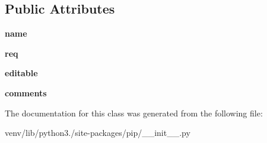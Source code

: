 \subsection*{Public Attributes}
\begin{DoxyCompactItemize}
\item 
\mbox{\label{classpip_1_1_frozen_requirement_a99dff1843f71d295ff1d7410cb85c6b8}} 
{\bfseries name}
\item 
\mbox{\label{classpip_1_1_frozen_requirement_a4f8a1bbaeefcbfdfe39df81f88471b5e}} 
{\bfseries req}
\item 
\mbox{\label{classpip_1_1_frozen_requirement_a68e051d6ca674d0cd1f1fec03052905b}} 
{\bfseries editable}
\item 
\mbox{\label{classpip_1_1_frozen_requirement_ae1bbeab72b9038ac8f103ae0d9ae61f8}} 
{\bfseries comments}
\end{DoxyCompactItemize}


The documentation for this class was generated from the following file\+:\begin{DoxyCompactItemize}
\item 
venv/lib/python3./site-\/packages/pip/\+\_\+\+\_\+init\+\_\+\+\_\+.\+py\end{DoxyCompactItemize}
